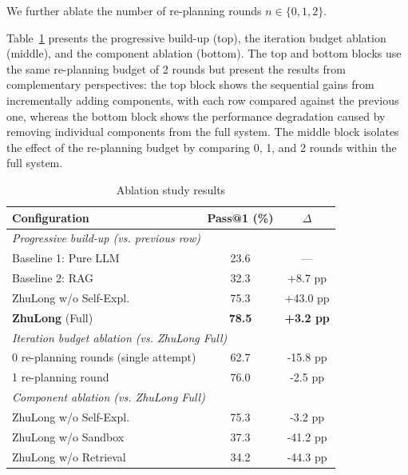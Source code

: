 We further ablate the number of re-planning rounds $n \in \{0, 1, 2\}$.

Table~\ref{tab:main-ablation} presents the progressive build-up (top), the
iteration budget ablation (middle), and the component ablation (bottom).
The top and bottom blocks use the same re-planning budget of 2 rounds but
present the results from complementary perspectives: the top block shows
the sequential gains from incrementally adding components, with each row
compared against the previous one, whereas the bottom block shows the
performance degradation caused by removing individual components from the
full system. The middle block isolates the effect of the re-planning budget
by comparing 0, 1, and 2 rounds within the full system.

\begin{table}[htbp]
\centering
\caption{Ablation study results}
\label{tab:main-ablation}
\begin{tabular}{lcc}
\toprule
\textbf{Configuration} & \textbf{Pass@1 (\%)} & \textbf{$\Delta$} \\
\midrule
\multicolumn{3}{l}{\textit{Progressive build-up (vs. previous row)}} \\
Baseline 1: Pure LLM & 23.6 & — \\
Baseline 2: RAG & 32.3 & +8.7 pp \\
ZhuLong w/o Self-Expl. & 75.3 & +43.0 pp \\
\textbf{ZhuLong} (Full) & \textbf{78.5} & \textbf{+3.2 pp} \\
\midrule
\multicolumn{3}{l}{\textit{Iteration budget ablation (vs. ZhuLong Full)}} \\
0 re-planning rounds (single attempt) & 62.7 & -15.8 pp \\
1 re-planning round & 76.0 & -2.5 pp \\
\midrule
\multicolumn{3}{l}{\textit{Component ablation (vs. ZhuLong Full)}} \\
ZhuLong w/o Self-Expl. & 75.3 & -3.2 pp \\
ZhuLong w/o Sandbox & 37.3 & -41.2 pp \\
ZhuLong w/o Retrieval & 34.2 & -44.3 pp \\
\bottomrule
\end{tabular}
\end{table}

